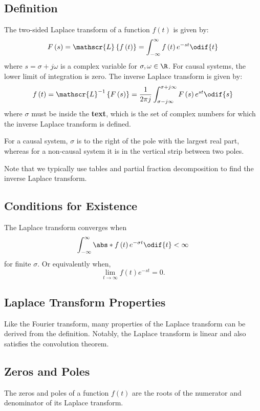 \documentclass{article}
\begin{document}
\subsection{Definition}
The two-sided Laplace transform of a function \(f\left( t \right)\) is given by:
\begin{equation*}
    F\left( s \right) = \mathscr{L}\left\{ f\left( t \right) \right\} = \int_{-\infty}^\infty f\left( t \right) e^{-st} \odif{t}
\end{equation*}
where \(s = \sigma + j \omega\) is a complex variable for \(\sigma, \omega \in \R\).
For causal systems, the lower limit of integration is zero.
The inverse Laplace transform is given by:
\begin{equation*}
    f\left( t \right) = \mathscr{L}^{-1}\left\{ F\left( s \right) \right\} = \frac{1}{2\pi j} \int_{\sigma - j\infty}^{\sigma + j\infty} F\left( s \right) e^{st} \odif{s}
\end{equation*}
where \(\sigma\) must be inside the \textbf{text}, which is the
set of complex numbers for which the inverse Laplace transform is defined.

For a causal system, \(\sigma\) is to the right of the pole with the largest real part,
whereas for a non-causal system it is in the vertical strip between two poles.

Note that we typically use tables and partial fraction decomposition to find the inverse Laplace transform.
\subsection{Conditions for Existence}
The Laplace transform converges when
\begin{equation*}
    \int_{-\infty}^\infty \abs*{f\left( t \right) e^{-\sigma t}} \odif{t} < \infty
\end{equation*}
for finite \(\sigma\). Or equivalently when,
\begin{equation*}
    \lim_{t \to \infty} f\left( t \right) e^{-s t} = 0.
\end{equation*}
\subsection{Laplace Transform Properties}
Like the Fourier transform, many properties of the Laplace transform can be derived from the definition.
Notably, the Laplace transform is linear and also satisfies the convolution theorem.
\subsection{Zeros and Poles}
The zeros and poles of a function \(f\left( t \right)\) are the roots of the numerator and denominator of its Laplace transform.
\end{document}
